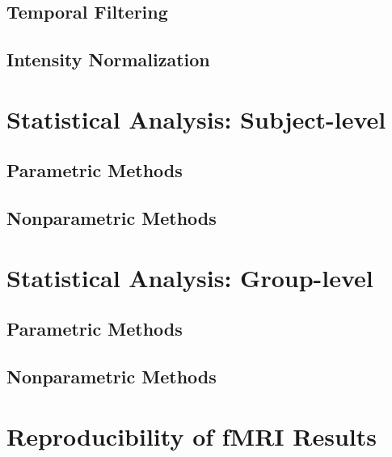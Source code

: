 \subsection{Temporal Filtering}

\subsection{Intensity Normalization}

\section{Statistical Analysis: Subject-level}

\subsection{Parametric Methods}

\subsection{Nonparametric Methods}

\section{Statistical Analysis: Group-level}

\subsection{Parametric Methods}

\subsection{Nonparametric Methods}

\section{Reproducibility of fMRI Results}

